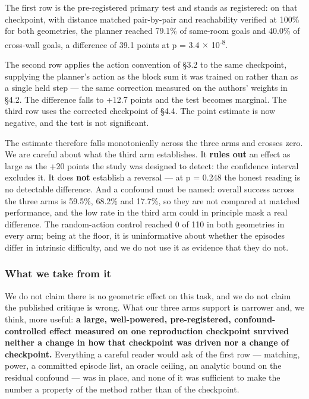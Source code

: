 \documentclass[10pt]{article}
\newcounter{none}
\begin{document}
The first row is the pre-registered primary test and stands as registered: on
that checkpoint, with distance matched pair-by-pair and reachability verified at
100\% for both geometries, the planner reached 79.1\% of same-room goals and 40.0\%
of cross-wall goals, a difference of 39.1 points at p = 3.4 $\times$ 10\textsuperscript{-8}.

The second row applies the action convention of \S{}3.2 to the same checkpoint,
supplying the planner's action as the block sum it was trained on rather than
as a single held step --- the same correction measured on the authors' weights in
\S{}4.2. The difference falls to +12.7 points and the test becomes
marginal. The third row uses the corrected checkpoint of \S{}4.4. The point estimate
is now negative, and the test is not significant.

The estimate therefore falls monotonically across the three arms and crosses
zero. We are careful about what the third arm establishes. It \textbf{rules out} an
effect as large as the +20 points the study was designed to detect: the
confidence interval excludes it. It does \textbf{not} establish a reversal --- at
p = 0.248 the honest reading is no detectable difference. And a confound must be
named: overall success across the three arms is 59.5\%, 68.2\% and 17.7\%, so they
are not compared at matched performance, and the low rate in the third arm could
in principle mask a real difference. The random-action control reached 0 of 110
in both geometries in every arm; being at the floor, it is uninformative about
whether the episodes differ in intrinsic difficulty, and we do not use it as
evidence that they do not.

\subsubsection{What we take from it}\label{what-we-take-from-it}

We do not claim there is no geometric effect on this task, and we do not claim
the published critique is wrong. What our three arms support is narrower and, we
think, more useful: \textbf{a large, well-powered, pre-registered, confound-controlled
effect measured on one reproduction checkpoint survived neither a change in how
that checkpoint was driven nor a change of checkpoint.} Everything a careful
reader would ask of the first row --- matching, power, a committed episode list, an
oracle ceiling, an analytic bound on the residual confound --- was in place, and
none of it was sufficient to make the number a property of the method rather
than of the checkpoint.
\end{document}
